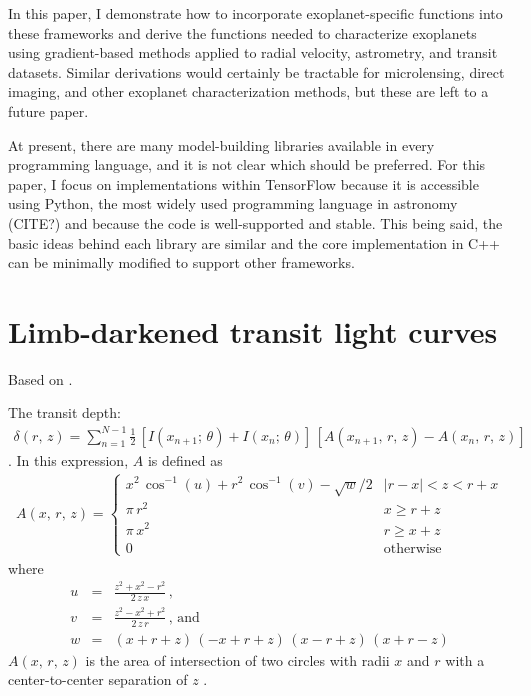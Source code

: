 \documentclass[modern]{aastex62}
\begin{document}
In this paper, I demonstrate how to incorporate exoplanet-specific functions
into these frameworks and derive the functions needed to characterize
exoplanets using gradient-based methods applied to radial velocity,
astrometry, and transit datasets.
Similar derivations would certainly be tractable for microlensing, direct
imaging, and other exoplanet characterization methods, but these are left to a
future paper.

At present, there are many model-building libraries available in every
programming language, and it is not clear which should be preferred.
For this paper, I focus on implementations within TensorFlow
\citep{Abadi:2016} because it is accessible using Python, the most widely used
programming language in astronomy (CITE?) and because the code is
well-supported and stable.
This being said, the basic ideas behind each library are similar and the core
implementation in C++ can be minimally modified to support other frameworks.

\section{Limb-darkened transit light curves}

Based on  \citep{Kreidberg:2015}.

The transit depth:
\begin{eqnarray}
\delta(r,\,z) = \sum_{n=1}^{N-1} \frac{1}{2}\,\left[I(x_{n+1};\,\theta) +
I(x_n;\,\theta)\right]\,
\left[A(x_{n+1},\,r,\,z) - A(x_n,\,r,\,z)\right]
\end{eqnarray}
.
In this expression, $A$ is defined as
\begin{eqnarray}
A(x,\,r,\,z) = \left\{\begin{array}{ll}
x^2\,\cos^{-1}(u)+r^2\,\cos^{-1}(v)-\sqrt{w}/2 &
    \left|r-x\right| < z < r + x \\
\pi\,r^2 & x \ge r + z \\
\pi\,x^2 & r \ge x + z \\
0 & \mathrm{otherwise}
\end{array}\right.
\end{eqnarray}
where
\begin{eqnarray}
u &=& \frac{z^2+x^2-r^2}{2\,z\,x} \,,\\
v &=& \frac{z^2-x^2+r^2}{2\,z\,r} \,,\,\mathrm{and}\\
w &=& (x+r+z)\,(-x+r+z)\,(x-r+z)\,(x+r-z)
\end{eqnarray}
$A(x,\,r,\,z)$ is the area of intersection of two circles with radii $x$ and
$r$ with a center-to-center separation of $z$ \citep{Mandel:2002,
Kreidberg:2015}.
\end{document}

